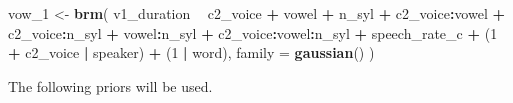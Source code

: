 \documentclass[11pt,]{article}
\newenvironment{Shaded}{\begin{snugshade}}{\end{snugshade}}
\newcommand{\DataTypeTok}[1]{\textcolor[rgb]{0.13,0.29,0.53}{#1}}
\newcommand{\DecValTok}[1]{\textcolor[rgb]{0.00,0.00,0.81}{#1}}
\newcommand{\KeywordTok}[1]{\textcolor[rgb]{0.13,0.29,0.53}{\textbf{#1}}}
\newcommand{\NormalTok}[1]{#1}
\newcommand{\OperatorTok}[1]{\textcolor[rgb]{0.81,0.36,0.00}{\textbf{#1}}}
\newcommand{\StringTok}[1]{\textcolor[rgb]{0.31,0.60,0.02}{#1}}
\begin{document}
\begin{Shaded}
\begin{Highlighting}[]
\NormalTok{vow_}\DecValTok{1}\NormalTok{ <-}\StringTok{ }\KeywordTok{brm}\NormalTok{(}
\NormalTok{  v1_duration }\OperatorTok{~}
\StringTok{    }\NormalTok{c2_voice }\OperatorTok{+}
\StringTok{    }\NormalTok{vowel }\OperatorTok{+}
\StringTok{    }\NormalTok{n_syl }\OperatorTok{+}
\StringTok{    }\NormalTok{c2_voice}\OperatorTok{:}\NormalTok{vowel }\OperatorTok{+}
\StringTok{    }\NormalTok{c2_voice}\OperatorTok{:}\NormalTok{n_syl }\OperatorTok{+}
\StringTok{    }\NormalTok{vowel}\OperatorTok{:}\NormalTok{n_syl }\OperatorTok{+}
\StringTok{    }\NormalTok{c2_voice}\OperatorTok{:}\NormalTok{vowel}\OperatorTok{:}\NormalTok{n_syl }\OperatorTok{+}
\StringTok{    }\NormalTok{speech_rate_c }\OperatorTok{+}
\StringTok{    }\NormalTok{(}\DecValTok{1} \OperatorTok{+}\StringTok{ }\NormalTok{c2_voice }\OperatorTok{|}\StringTok{ }\NormalTok{speaker) }\OperatorTok{+}
\StringTok{    }\NormalTok{(}\DecValTok{1} \OperatorTok{|}\StringTok{ }\NormalTok{word),}
  \DataTypeTok{family =} \KeywordTok{gaussian}\NormalTok{()}
\NormalTok{)}
\end{Highlighting}
\end{Shaded}

The following priors will be used.
\end{document}

